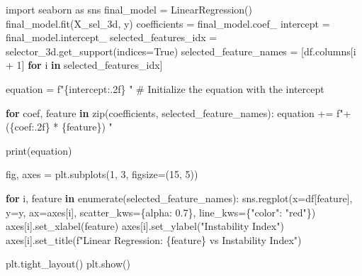 \documentclass[
  letterpaper,
  DIV=11,
  numbers=noendperiod]{scrartcl}
\newenvironment{Shaded}{\begin{snugshade}}{\end{snugshade}}
\newcommand{\BuiltInTok}[1]{\textcolor[rgb]{0.00,0.23,0.31}{#1}}
\newcommand{\CommentTok}[1]{\textcolor[rgb]{0.37,0.37,0.37}{#1}}
\newcommand{\ControlFlowTok}[1]{\textcolor[rgb]{0.00,0.23,0.31}{\textbf{#1}}}
\newcommand{\DecValTok}[1]{\textcolor[rgb]{0.68,0.00,0.00}{#1}}
\newcommand{\FloatTok}[1]{\textcolor[rgb]{0.68,0.00,0.00}{#1}}
\newcommand{\ImportTok}[1]{\textcolor[rgb]{0.00,0.46,0.62}{#1}}
\newcommand{\KeywordTok}[1]{\textcolor[rgb]{0.00,0.23,0.31}{\textbf{#1}}}
\newcommand{\NormalTok}[1]{\textcolor[rgb]{0.00,0.23,0.31}{#1}}
\newcommand{\OperatorTok}[1]{\textcolor[rgb]{0.37,0.37,0.37}{#1}}
\newcommand{\SpecialCharTok}[1]{\textcolor[rgb]{0.37,0.37,0.37}{#1}}
\newcommand{\SpecialStringTok}[1]{\textcolor[rgb]{0.13,0.47,0.30}{#1}}
\newcommand{\StringTok}[1]{\textcolor[rgb]{0.13,0.47,0.30}{#1}}
\newcommand{\VariableTok}[1]{\textcolor[rgb]{0.07,0.07,0.07}{#1}}
\begin{document}
\begin{Shaded}
\begin{Highlighting}[]
\ImportTok{import}\NormalTok{ seaborn }\ImportTok{as}\NormalTok{ sns}
\NormalTok{final\_model }\OperatorTok{=}\NormalTok{ LinearRegression()}
\NormalTok{final\_model.fit(X\_sel\_3d, y)}
\NormalTok{coefficients }\OperatorTok{=}\NormalTok{ final\_model.coef\_}
\NormalTok{intercept }\OperatorTok{=}\NormalTok{ final\_model.intercept\_}
\NormalTok{selected\_features\_idx }\OperatorTok{=}\NormalTok{ selector\_3d.get\_support(indices}\OperatorTok{=}\VariableTok{True}\NormalTok{)}
\NormalTok{selected\_feature\_names }\OperatorTok{=}\NormalTok{ [df.columns[i }\OperatorTok{+} \DecValTok{1}\NormalTok{] }\ControlFlowTok{for}\NormalTok{ i }\KeywordTok{in}\NormalTok{ selected\_features\_idx]}

\NormalTok{equation }\OperatorTok{=} \SpecialStringTok{f"}\SpecialCharTok{\{}\NormalTok{intercept}\SpecialCharTok{:.2f\}}\SpecialStringTok{ "}  \CommentTok{\# Initialize the equation with the intercept}

\ControlFlowTok{for}\NormalTok{ coef, feature }\KeywordTok{in} \BuiltInTok{zip}\NormalTok{(coefficients, selected\_feature\_names):}
\NormalTok{    equation }\OperatorTok{+=} \SpecialStringTok{f"+ (}\SpecialCharTok{\{}\NormalTok{coef}\SpecialCharTok{:.2f\}}\SpecialStringTok{ * }\SpecialCharTok{\{}\NormalTok{feature}\SpecialCharTok{\}}\SpecialStringTok{) "}

\BuiltInTok{print}\NormalTok{(equation)}

\NormalTok{fig, axes }\OperatorTok{=}\NormalTok{ plt.subplots(}\DecValTok{1}\NormalTok{, }\DecValTok{3}\NormalTok{, figsize}\OperatorTok{=}\NormalTok{(}\DecValTok{15}\NormalTok{, }\DecValTok{5}\NormalTok{))}

\ControlFlowTok{for}\NormalTok{ i, feature }\KeywordTok{in} \BuiltInTok{enumerate}\NormalTok{(selected\_feature\_names):}
\NormalTok{    sns.regplot(x}\OperatorTok{=}\NormalTok{df[feature], y}\OperatorTok{=}\NormalTok{y, ax}\OperatorTok{=}\NormalTok{axes[i], scatter\_kws}\OperatorTok{=}\NormalTok{\{}\StringTok{\textquotesingle{}alpha\textquotesingle{}}\NormalTok{: }\FloatTok{0.7}\NormalTok{\}, line\_kws}\OperatorTok{=}\NormalTok{\{}\StringTok{"color"}\NormalTok{: }\StringTok{"red"}\NormalTok{\})}
\NormalTok{    axes[i].set\_xlabel(feature)}
\NormalTok{    axes[i].set\_ylabel(}\StringTok{"Instability Index"}\NormalTok{)}
\NormalTok{    axes[i].set\_title(}\SpecialStringTok{f"Linear Regression: }\SpecialCharTok{\{}\NormalTok{feature}\SpecialCharTok{\}}\SpecialStringTok{ vs Instability Index"}\NormalTok{)}

\NormalTok{plt.tight\_layout()}
\NormalTok{plt.show()}
\end{Highlighting}
\end{Shaded}
\end{document}
